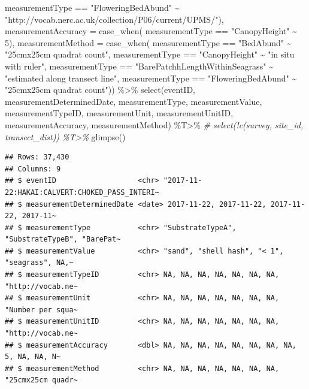\documentclass[
]{book}
\newenvironment{Shaded}{\begin{snugshade}}{\end{snugshade}}
\newcommand{\AttributeTok}[1]{\textcolor[rgb]{0.77,0.63,0.00}{#1}}
\newcommand{\CommentTok}[1]{\textcolor[rgb]{0.56,0.35,0.01}{\textit{#1}}}
\newcommand{\DecValTok}[1]{\textcolor[rgb]{0.00,0.00,0.81}{#1}}
\newcommand{\FunctionTok}[1]{\textcolor[rgb]{0.00,0.00,0.00}{#1}}
\newcommand{\NormalTok}[1]{#1}
\newcommand{\SpecialCharTok}[1]{\textcolor[rgb]{0.00,0.00,0.00}{#1}}
\newcommand{\StringTok}[1]{\textcolor[rgb]{0.31,0.60,0.02}{#1}}
\begin{document}
\begin{Shaded}
\begin{Highlighting}[]
\NormalTok{      measurementType }\SpecialCharTok{==} \StringTok{"FloweringBedAbund"} \SpecialCharTok{\textasciitilde{}} \StringTok{"http://vocab.nerc.ac.uk/collection/P06/current/UPMS/"}\NormalTok{),}
    \AttributeTok{measurementAccuracy =} \FunctionTok{case\_when}\NormalTok{(}
\NormalTok{      measurementType }\SpecialCharTok{==} \StringTok{"CanopyHeight"} \SpecialCharTok{\textasciitilde{}} \DecValTok{5}\NormalTok{),}
    \AttributeTok{measurementMethod =} \FunctionTok{case\_when}\NormalTok{(}
\NormalTok{      measurementType }\SpecialCharTok{==} \StringTok{"BedAbund"} \SpecialCharTok{\textasciitilde{}} \StringTok{"25cmx25cm quadrat count"}\NormalTok{,}
\NormalTok{      measurementType }\SpecialCharTok{==} \StringTok{"CanopyHeight"} \SpecialCharTok{\textasciitilde{}} \StringTok{"in situ with ruler"}\NormalTok{,}
\NormalTok{      measurementType }\SpecialCharTok{==} \StringTok{"BarePatchhLengthWithinSeagrass"} \SpecialCharTok{\textasciitilde{}} \StringTok{"estimated along transect line"}\NormalTok{,}
\NormalTok{      measurementType }\SpecialCharTok{==} \StringTok{"FloweringBedAbund"} \SpecialCharTok{\textasciitilde{}} \StringTok{"25cmx25cm quadrat count"}\NormalTok{)) }\SpecialCharTok{\%\textgreater{}\%}
  \FunctionTok{select}\NormalTok{(eventID, measurementDeterminedDate, measurementType, measurementValue,}
\NormalTok{         measurementTypeID, measurementUnit, measurementUnitID, measurementAccuracy,}
\NormalTok{         measurementMethod) }\SpecialCharTok{\%T\textgreater{}\%}
\CommentTok{\#  select(!c(survey, site\_id, transect\_dist)) \%T\textgreater{}\%}
  \FunctionTok{glimpse}\NormalTok{()}
\end{Highlighting}
\end{Shaded}

\begin{verbatim}
## Rows: 37,430
## Columns: 9
## $ eventID                   <chr> "2017-11-22:HAKAI:CALVERT:CHOKED_PASS_INTERI~
## $ measurementDeterminedDate <date> 2017-11-22, 2017-11-22, 2017-11-22, 2017-11~
## $ measurementType           <chr> "SubstrateTypeA", "SubstrateTypeB", "BarePat~
## $ measurementValue          <chr> "sand", "shell hash", "< 1", "seagrass", NA,~
## $ measurementTypeID         <chr> NA, NA, NA, NA, NA, NA, NA, "http://vocab.ne~
## $ measurementUnit           <chr> NA, NA, NA, NA, NA, NA, NA, "Number per squa~
## $ measurementUnitID         <chr> NA, NA, NA, NA, NA, NA, NA, "http://vocab.ne~
## $ measurementAccuracy       <dbl> NA, NA, NA, NA, NA, NA, NA, NA, 5, NA, NA, N~
## $ measurementMethod         <chr> NA, NA, NA, NA, NA, NA, NA, "25cmx25cm quadr~
\end{verbatim}
\end{document}
